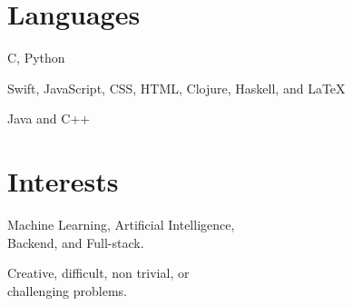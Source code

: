 \documentclass{tccv}
\newenvironment{itemize*}%
{\begin{itemize}%
    \vspace{-0.7em}
    \setlength{\itemsep}{0pt}%
    \setlength{\parskip}{0pt}}%
  {\end{itemize}}
\begin{document}
\section{Languages}

\begin{factlist}

  {C, Python}

  {Swift, JavaScript, CSS, HTML, Clojure, Haskell, and LaTeX}

  {Java and C++}

\end{factlist}

\section{Interests}
\begin{itemize*}
\item Machine Learning, Artificial Intelligence, \\
  Backend, and Full-stack.
\item Creative, difficult, non trivial, or \\
  challenging problems.
\end{itemize*}
\end{document}
